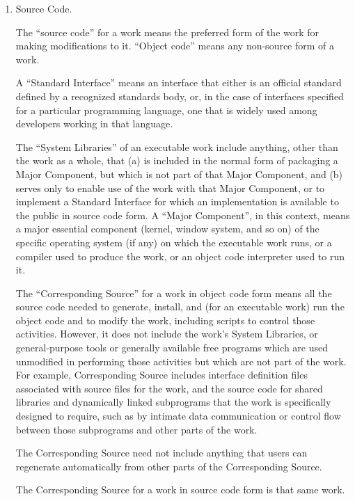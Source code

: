 \documentclass{article}
\begin{document}
\begin{enumerate}
    \item Source Code.
    
    The ``source code'' for a work means the preferred form of the work
    for making modifications to it.  ``Object code'' means any non-source
    form of a work.
    
    A ``Standard Interface'' means an interface that either is an official
    standard defined by a recognized standards body, or, in the case of
    interfaces specified for a particular programming language, one that
    is widely used among developers working in that language.
    
    The ``System Libraries'' of an executable work include anything, other
    than the work as a whole, that (a) is included in the normal form of
    packaging a Major Component, but which is not part of that Major
    Component, and (b) serves only to enable use of the work with that
    Major Component, or to implement a Standard Interface for which an
    implementation is available to the public in source code form.  A
    ``Major Component'', in this context, means a major essential component
    (kernel, window system, and so on) of the specific operating system
    (if any) on which the executable work runs, or a compiler used to
    produce the work, or an object code interpreter used to run it.
    
    The ``Corresponding Source'' for a work in object code form means all
    the source code needed to generate, install, and (for an executable
    work) run the object code and to modify the work, including scripts to
    control those activities.  However, it does not include the work's
    System Libraries, or general-purpose tools or generally available free
    programs which are used unmodified in performing those activities but
    which are not part of the work.  For example, Corresponding Source
    includes interface definition files associated with source files for
    the work, and the source code for shared libraries and dynamically
    linked subprograms that the work is specifically designed to require,
    such as by intimate data communication or control flow between those
    subprograms and other parts of the work.
    
    The Corresponding Source need not include anything that users
    can regenerate automatically from other parts of the Corresponding
    Source.
    
    The Corresponding Source for a work in source code form is that
    same work.
    

\end{enumerate}
\end{document}
